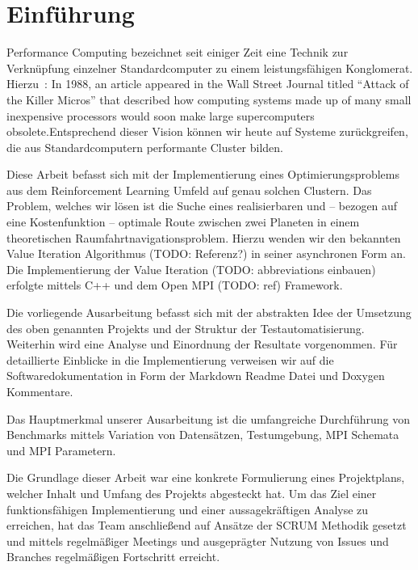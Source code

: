 \section{Einführung}
\label{sec:einfuehrung}
 Performance Computing bezeichnet seit einiger Zeit eine Technik zur Verknüpfung einzelner Standardcomputer zu einem leistungsfähigen Konglomerat. Hierzu~\citep{dowd1998high}: \glqq In 1988, an article appeared in the Wall Street Journal titled ``Attack of the Killer Micros'' that described how computing systems made up of many small inexpensive processors would soon make large supercomputers obsolete.\grqq Entsprechend dieser Vision können wir heute auf Systeme zurückgreifen, die aus Standardcomputern performante Cluster bilden.

Diese Arbeit befasst sich mit der Implementierung eines Optimierungsproblems aus dem Reinforcement Learning Umfeld auf genau solchen Clustern. Das Problem, welches wir lösen ist die Suche eines realisierbaren und -- bezogen auf eine Kostenfunktion -- optimale Route zwischen zwei Planeten in einem theoretischen Raumfahrtnavigationsproblem. Hierzu wenden wir den bekannten Value Iteration Algorithmus (TODO: Referenz?) in seiner asynchronen Form an. Die Implementierung der Value Iteration (TODO: abbreviations einbauen) erfolgte mittels C++ und dem Open MPI (TODO: ref) Framework.

Die vorliegende Ausarbeitung befasst sich mit der abstrakten Idee der Umsetzung des oben genannten Projekts und der Struktur der Testautomatisierung. Weiterhin wird eine Analyse und Einordnung der Resultate vorgenommen. Für detaillierte Einblicke in die Implementierung verweisen wir auf die Softwaredokumentation in Form der Markdown Readme Datei und Doxygen Kommentare.

Das Hauptmerkmal unserer Ausarbeitung ist die umfangreiche Durchführung von Benchmarks mittels Variation von Datensätzen, Testumgebung, MPI Schemata und MPI Parametern.

Die Grundlage dieser Arbeit war eine konkrete Formulierung eines Projektplans, welcher Inhalt und Umfang des Projekts abgesteckt hat. Um das Ziel einer funktionsfähigen Implementierung und einer aussagekräftigen Analyse zu erreichen, hat das Team anschließend auf Ansätze der SCRUM Methodik gesetzt und mittels regelmäßiger Meetings und ausgeprägter Nutzung von Issues und Branches regelmäßigen Fortschritt erreicht.

